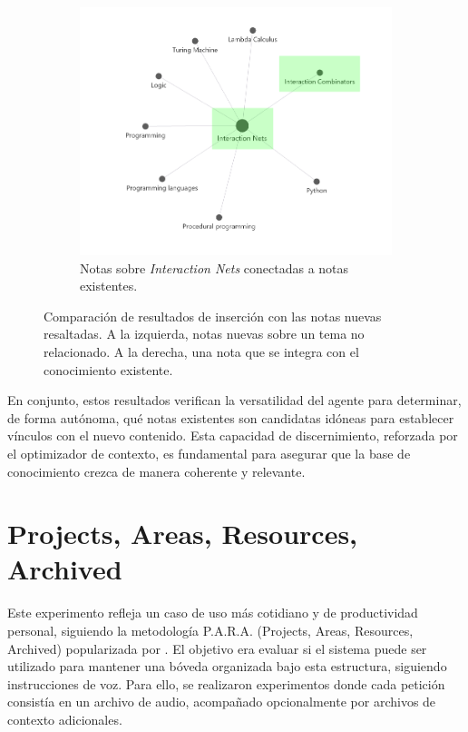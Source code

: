 \begin{figure}[h!]
\begin{subfigure}[b]{0.5\textwidth}
        \includegraphics[width=\textwidth]{figures/IntNetsPart.png}
        \caption{Notas sobre \textit{Interaction Nets} conectadas a notas existentes.}
        \label{fig:wiki_connected}
    \end{subfigure}
    \caption{Comparación de resultados de inserción con las notas nuevas resaltadas. A la izquierda, notas nuevas sobre un tema no relacionado. A la derecha, una nota que se integra con el conocimiento existente.}
    \label{fig:wiki_comparison}
\end{figure}

En conjunto, estos resultados verifican la versatilidad del agente para determinar, de forma autónoma, qué notas existentes son candidatas idóneas para establecer vínculos con el nuevo contenido. Esta capacidad de discernimiento, reforzada por el optimizador de contexto, es fundamental para asegurar que la base de conocimiento crezca de manera coherente y relevante.

\section{Projects, Areas, Resources, Archived}
Este experimento refleja un caso de uso más cotidiano y de productividad personal, siguiendo la metodología P.A.R.A. (Projects, Areas, Resources, Archived) popularizada por \cite{forteBuildingSecondBrain2022}. El objetivo era evaluar si el sistema puede ser utilizado para mantener una bóveda organizada bajo esta estructura, siguiendo instrucciones de voz. Para ello, se realizaron experimentos donde cada petición consistía en un archivo de audio, acompañado opcionalmente por archivos de contexto adicionales.

